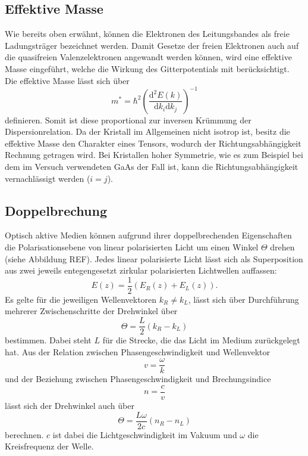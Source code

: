 \subsection{Effektive Masse}

Wie bereits oben erwähnt, können die Elektronen des Leitungsbandes als freie Ladungsträger bezeichnet werden.
Damit Gesetze der freien Elektronen auch auf die quasifreien Valenzelektronen angewandt werden können, wird eine effektive Masse eingeführt, welche die Wirkung des Gitterpotentials mit berücksichtigt.
Die effektive Masse lässt sich über
\begin{equation}
    m^* = \hbar^2 \left( \frac{\text{d}^2E(k)}{\text{d}k_i \text{d}k_j} \right)^{-1}
\end{equation}
definieren.
Somit ist diese proportional zur inversen Krümmung der Dispersionrelation.
Da der Kristall im Allgemeinen nicht isotrop ist, besitz die effektive Masse den Charakter eines Tensors, wodurch der Richtungsabhängigkeit Rechnung getragen wird.
Bei Kristallen hoher Symmetrie, wie es zum Beispiel bei dem im Versuch verwendeten GaAs der Fall ist, kann die Richtungsabhängigkeit vernachlässigt werden ($i=j$).





\subsection{Doppelbrechung}
\label{sub:doppel}
Optisch aktive Medien können aufgrund ihrer doppelbrechenden Eigenschaften die Polarisationsebene von linear polarisierten Licht um einen Winkel $\Theta$ drehen (siehe Abbildung REF).
Jedes linear polarisierte Licht lässt sich als Superposition aus zwei jeweils entegengesetzt zirkular polarisierten Lichtwellen auffassen:
\begin{equation*}
    E(z) = \frac{1}{2} (E_R(z)+E_L(z)).
\end{equation*}
Es gelte für die jeweiligen Wellenvektoren $k_R \neq k_L$, lässt sich über Durchführung mehrerer Zwischenschritte der Drehwinkel über
\begin{equation}
    \Theta = \frac{L}{2}(k_R-k_L)
\end{equation}
bestimmen. Dabei steht $L$ für die Strecke, die das Licht im Medium zurückgelegt hat.
Aus der Relation zwischen Phasengeschwindigkeit und Wellenvektor
\begin{equation*}
    v = \frac{\omega}{k}
\end{equation*}
und der Beziehung zwischen Phasengeschwindigkeit und Brechungsindice
\begin{equation*}
    n = \frac{c}{v}
\end{equation*}
lässt sich der Drehwinkel auch über
\begin{equation}
    \Theta = \frac{L\omega}{2c}(n_R-n_L)
\end{equation}
berechnen. $c$ ist dabei die Lichtgeschwindigkeit im Vakuum und $\omega$ die Kreisfrequenz der Welle.




